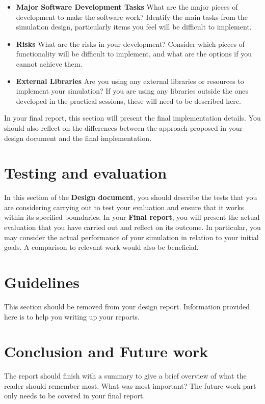 \documentclass[conference,backref=page]{acmsiggraph}
\begin{document}
\begin{itemize}
\item  {\bf Major Software Development Tasks} What are the major pieces of development to make the software work?  Identify the main tasks from the simulation design, particularly items you feel will be difficult to implement. 
\item {\bf Risks} What are the risks in your development?  Consider which pieces of functionality will be difficult to implement, and what are the options if you cannot achieve them.
\item {\bf External Libraries} Are you using any external libraries or resources to implement your simulation?  If you are using any libraries outside the ones developed in the practical sessions, these will need to be described here.
\end{itemize}

In your final report, this section will present the final implementation details. You should also reflect on the differences between the approach proposed in your design document and the final implementation.

\section{Testing and evaluation}
In this section of the {\bf Design document}, you should describe the tests that you are considering carrying out to test your evaluation and ensure that it works within its specified boundaries. In your {\bf Final report}, you will present the actual evaluation that you have carried out and reflect on its outcome. In particular, you may consider the actual performance of your simulation in relation to your initial goals. A comparison to relevant work would also be beneficial.

\section{Guidelines}
This section should be removed from your design report. Information provided here is to help you writing up your reports.


\section{Conclusion and Future work}
The report should finish with a summary to give a brief overview of what the reader should remember most.  What was most important? The future work part only needs to be covered in your final report.






\end{document}
